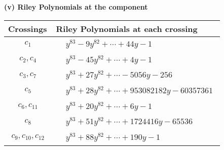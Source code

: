 \documentclass[1p]{elsarticle_modified}
\theoremstyle{definition}
\begin{document}
\flushleft \textbf{(v) Riley Polynomials at the component}\newline \\
\begin{tabular}{m{50pt}|m{274pt}}
Crossings & \hspace{64pt}Riley Polynomials at each crossing \\
\hline $$\begin{aligned}c_{1}\end{aligned}$$&$\begin{aligned}
&y^{83}-9 y^{82}+\cdots+44 y-1
\end{aligned}$\\
\hline $$\begin{aligned}c_{2},c_{4}\end{aligned}$$&$\begin{aligned}
&y^{83}-45 y^{82}+\cdots+4 y-1
\end{aligned}$\\
\hline $$\begin{aligned}c_{3},c_{7}\end{aligned}$$&$\begin{aligned}
&y^{83}+27 y^{82}+\cdots-5056 y-256
\end{aligned}$\\
\hline $$\begin{aligned}c_{5}\end{aligned}$$&$\begin{aligned}
&y^{83}+28 y^{82}+\cdots+953082182 y-60357361
\end{aligned}$\\
\hline $$\begin{aligned}c_{6},c_{11}\end{aligned}$$&$\begin{aligned}
&y^{83}+20 y^{82}+\cdots+6 y-1
\end{aligned}$\\
\hline $$\begin{aligned}c_{8}\end{aligned}$$&$\begin{aligned}
&y^{83}+51 y^{82}+\cdots+1724416 y-65536
\end{aligned}$\\
\hline $$\begin{aligned}c_{9},c_{10},c_{12}\end{aligned}$$&$\begin{aligned}
&y^{83}+88 y^{82}+\cdots+190 y-1
\end{aligned}$\\
\hline
\end{tabular}\\~\\
\end{document}
